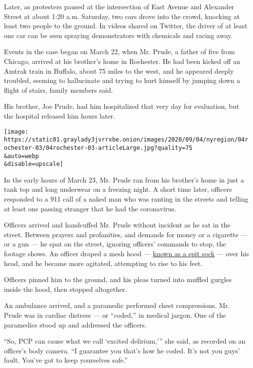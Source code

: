 Later, as protesters paused at the intersection of East Avenue and
Alexander Street at about 1:20 a.m. Saturday, two cars drove into the
crowd, knocking at least two people to the ground. In videos shared on
Twitter, the driver of at least one car can be seen spraying
demonstrators with chemicals and racing away.

Events in the case began on March 22, when Mr. Prude, a father of five
from Chicago, arrived at his brother's home in Rochester. He had been
kicked off an Amtrak train in Buffalo, about 75 miles to the west, and
he appeared deeply troubled, seeming to hallucinate and trying to hurt
himself by jumping down a flight of stairs, family members said.

His brother, Joe Prude, had him hospitalized that very day for
evaluation, but the hospital released him hours later.

\texttt{[image: https://static01.graylady3jvrrxbe.onion/images/2020/09/04/nyregion/04rochester-03/04rochester-03-articleLarge.jpg?quality=75\\\&auto=webp\\\&disable=upscale]}

In the early hours of March 23, Mr. Prude ran from his brother's home in
just a tank top and long underwear on a freezing night. A short time
later, officers responded to a 911 call of a naked man who was ranting
in the streets and telling at least one passing stranger that he had the
coronavirus.

Officers arrived and handcuffed Mr. Prude without incident as he sat in
the street. Between prayers and profanities, and demands for money or a
cigarette --- or a gun --- he spat on the street, ignoring officers'
commands to stop, the footage shows. An officer draped a mesh hood ---
\href{https://www.nytimes3xbfgragh.onion/2020/09/03/nyregion/spit-hoods-police.html}{known
as a spit sock} --- over his head, and he became more agitated,
attempting to rise to his feet.

Officers pinned him to the ground, and his pleas turned into muffled
gurgles inside the hood, then stopped altogether.

An ambulance arrived, and a paramedic performed chest compressions. Mr.
Prude was in cardiac distress --- or ``coded,'' in medical jargon. One
of the paramedics stood up and addressed the officers.

``So, PCP can cause what we call `excited delirium,''' she said, as
recorded on an officer's body camera. ``I guarantee you that's how he
coded. It's not you guys' fault. You've got to keep yourselves safe.''

